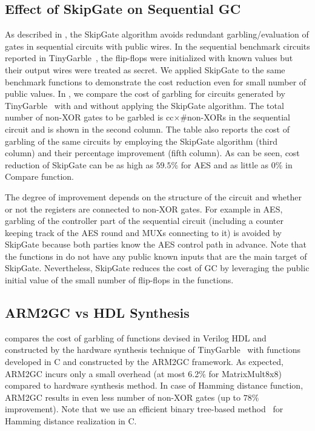 \subsection{Effect of SkipGate on Sequential GC}
As described in , the SkipGate algorithm avoids redundant garbling/evaluation of gates in sequential circuits with public wires.
In the sequential benchmark circuits reported in TinyGarble~\cite{songhori2015tinygarble}, the flip-flops were initialized with known values but their output wires were treated as secret.
We applied SkipGate to the same benchmark functions to demonstrate the cost reduction even for small number of public values.
In , we compare the cost of garbling for circuits generated by TinyGarble~\cite{songhori2015tinygarble} with and without applying the SkipGate algorithm.
The total number of non-XOR gates to be garbled is cc$\times$\#non-XORs in the sequential circuit and is shown in the second column.
The table also reports the cost of garbling of the same circuits by employing the SkipGate algorithm (third column) and their percentage improvement (fifth column).
As can be seen, cost reduction of SkipGate can be as high as $59.5\%$ for AES and as little as $0\%$ in Compare function.

The degree of improvement depends on the structure of the circuit and whether or not the registers are connected to non-XOR gates.
For example in AES, garbling of the controller part of the sequential circuit (including a counter keeping track of the AES round and MUXs connecting to it) is avoided by SkipGate because both parties know the AES control path in advance.
Note that the functions in  do not have any public known inputs that are the main target of SkipGate.
Nevertheless, SkipGate reduces the cost of GC by leveraging the public initial value of the small number of flip-flops in the functions.

\subsection{ARM2GC vs HDL Synthesis}
 compares the cost of garbling of functions devised in Verilog HDL and constructed by the hardware synthesis technique of TinyGarble~\cite{songhori2015tinygarble} with functions developed in C and constructed by the ARM2GC framework.
As expected, ARM2GC incurs only a small overhead (at most 6.2\% for MatrixMult8x8) compared to hardware synthesis method.
In case of Hamming distance function, ARM2GC results in even less number of non-XOR gates (up to $78\%$ improvement).
Note that we use an efficient binary tree-based method~\cite{huang2011faster} for Hamming distance realization in C.

